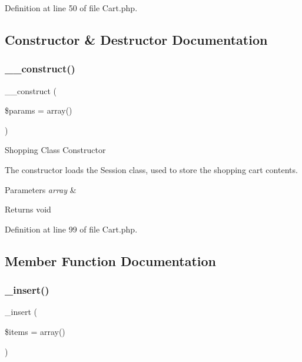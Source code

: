 Definition at line 50 of file Cart.\+php.



\subsection{Constructor \& Destructor Documentation}
\mbox{\label{class_c_i___cart_a568ecdb0d73d2a870f33189739922a50}} 
\subsubsection{\texorpdfstring{\_\_construct()}{\_\_construct()}}
{\footnotesize\ttfamily \+\_\+\+\_\+construct (\begin{DoxyParamCaption}\item[{}]{\$params = {\ttfamily array()} }\end{DoxyParamCaption})}

Shopping Class Constructor

The constructor loads the Session class, used to store the shopping cart contents.


\begin{DoxyParams}{Parameters}
{\em array} & \\
\hline
\end{DoxyParams}
\begin{DoxyReturn}{Returns}
void 
\end{DoxyReturn}


Definition at line 99 of file Cart.\+php.



\subsection{Member Function Documentation}
\mbox{\label{class_c_i___cart_a55d27979573b7d46bdf774f247c15b07}} 
\subsubsection{\texorpdfstring{\_insert()}{\_insert()}}
{\footnotesize\ttfamily \+\_\+insert (\begin{DoxyParamCaption}\item[{}]{\$items = {\ttfamily array()} }\end{DoxyParamCaption})\hspace{0.3cm}{\ttfamily [protected]}}

